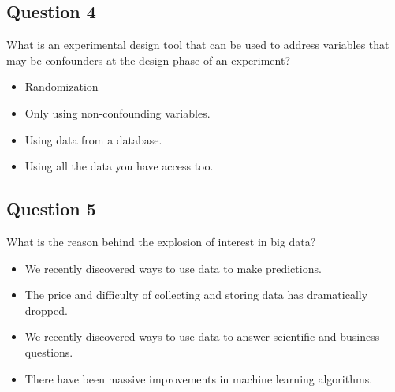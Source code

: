 \subsection*{Question 4}
What is an experimental design tool that can be used to address variables that may be confounders at the design phase of an experiment?
\begin{itemize}
\item Randomization
\item Only using non-confounding variables.
\item Using data from a database.
\item Using all the data you have access too.
\end{itemize}
\subsection*{Question 5}
What is the reason behind the explosion of interest in big data?

\begin{itemize}
\item We recently discovered ways to use data to make predictions.
\item The price and difficulty of collecting and storing data has dramatically dropped.
\item We recently discovered ways to use data to answer scientific and business questions.
\item There have been massive improvements in machine learning algorithms.
\end{itemize}
